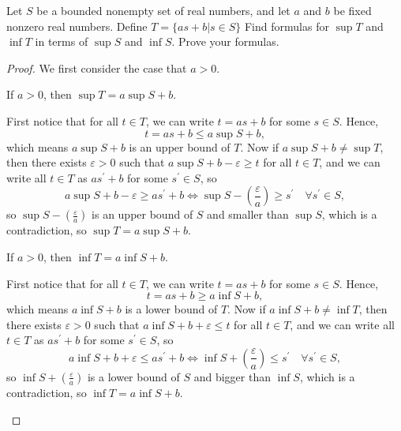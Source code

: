 \begin{problem}[10 pts]  
Let $S$ be a bounded nonempty set of real numbers, and let $a$ and $b$
be fixed  nonzero real numbers. Define $T=\{as+b| s\in S\}$ Find formulas
for
$\sup T$ and $\inf T$ in terms of $\sup S$ and $\inf S$. Prove your
formulas.
\end{problem}
\begin{proof}
  We first consider the case that \(a > 0\). 
\begin{claim}
If \(a > 0\), then \(\sup T = a \sup S + b\). 
\end{claim}
\begin{explanation}
First notice that for all \(t \in T\), we can write \(t = as + b\) for some \(s \in S\). Hence, 
\[
  t = a s + b \le  a \sup S + b,
\]   
which means \(a \sup S + b\) is an upper bound of \(T\). Now if \(a \sup S + b \neq \sup T\), then there exists \(\varepsilon > 0\) such that \(a \sup S + b - \varepsilon \ge t\) for all \(t \in T\), and we can write all \(t \in T\) as \(a s^{\prime} + b\) for some \(s^{\prime} \in S\), so 
\[
  a \sup S + b - \varepsilon \ge a s^{\prime} + b \iff \sup S - \left( \frac{\varepsilon}{a} \right)  \ge s^{\prime} \quad \forall s^{\prime}  \in S,
\] so \(\sup S - \left( \frac{\varepsilon}{a} \right) \) is an upper bound of \(S\) and smaller than \(\sup S\), which is a contradiction, so \(\sup T = a \sup S + b\).    
\end{explanation}

\begin{claim}
  If \(a > 0\), then \(\inf T = a \inf S + b\).  
\end{claim}
\begin{explanation}
  First notice that for all \(t \in T\), we can write \(t = as + b\) for some \(s \in S\). Hence, 
\[
  t = a s + b \ge  a \inf S + b,
\]   
which means \(a \inf S + b\) is a lower bound of \(T\). Now if \(a \inf S + b \neq \inf T\), then there exists \(\varepsilon > 0\) such that \(a \inf S + b + \varepsilon \le t\) for all \(t \in T\), and we can write all \(t \in T\) as \(a s^{\prime} + b\) for some \(s^{\prime} \in S\), so 
\[
  a \inf S + b + \varepsilon \le a s^{\prime} + b \iff \inf S + \left( \frac{\varepsilon}{a} \right)  \le s^{\prime} \quad \forall s^{\prime}  \in S,
\] so \(\inf S + \left( \frac{\varepsilon}{a} \right) \) is a lower bound of \(S\) and bigger than \(\inf S\), which is a contradiction, so \(\inf T = a \inf S + b\).   
\end{explanation}


\end{proof}
